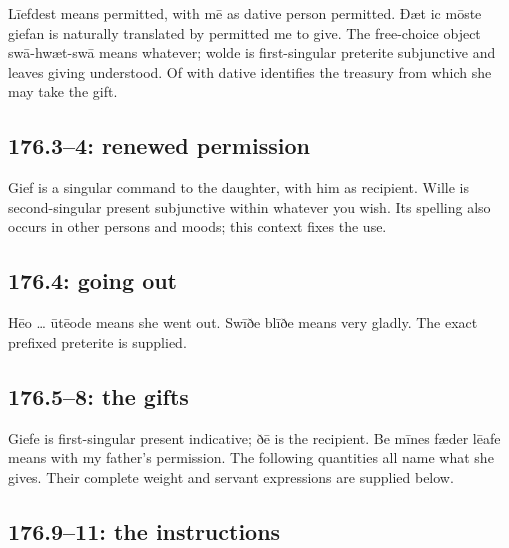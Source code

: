 Līefdest means permitted, with mē as dative person permitted. Ðæt ic mōste giefan is naturally translated by permitted me to give. The free-choice object swā-hwæt-swā means whatever; wolde is first-singular preterite subjunctive and leaves giving understood. Of with dative identifies the treasury from which she may take the gift.

\subsection*{176.3–4: renewed permission}

Gief is a singular command to the daughter, with him as recipient. Wille is second-singular present subjunctive within whatever you wish. Its spelling also occurs in other persons and moods; this context fixes the use.

\subsection*{176.4: going out}

Hēo … ūtēode means she went out. Swīðe blīðe means very gladly. The exact prefixed preterite is supplied.

\subsection*{176.5–8: the gifts}

Giefe is first-singular present indicative; ðē is the recipient. Be mīnes fæder lēafe means with my father’s permission. The following quantities all name what she gives. Their complete weight and servant expressions are supplied below.

\subsection*{176.9–11: the instructions}

